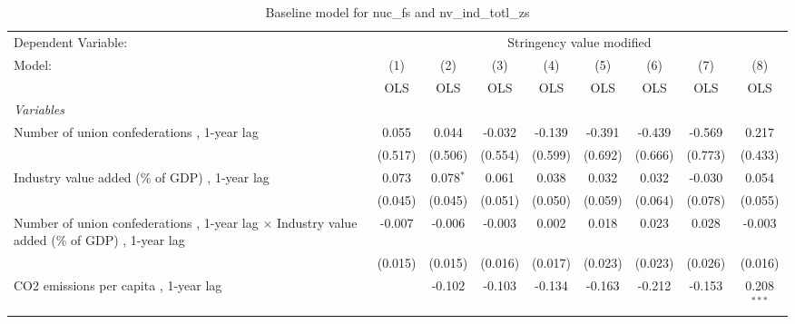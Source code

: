
\begin{table}[htbp]
   \caption{Baseline model for nuc\_fs and nv\_ind\_totl\_zs}
   \centering
   \begin{tabular}{lcccccccc}
      \toprule
      Dependent Variable: & \multicolumn{8}{c}{Stringency value modified}\\
      Model:                                                                                               & (1)     & (2)         & (3)     & (4)          & (5)          & (6)           & (7)           & (8)\\  
                                                                                                           &  OLS    & OLS         & OLS     & OLS          & OLS          & OLS           & OLS           & OLS\\  
      \midrule
      \emph{Variables}\\
      Number of union confederations , 1-year lag                                                          & 0.055   & 0.044       & -0.032  & -0.139       & -0.391       & -0.439        & -0.569        & 0.217\\   
                                                                                                           & (0.517) & (0.506)     & (0.554) & (0.599)      & (0.692)      & (0.666)       & (0.773)       & (0.433)\\   
      Industry value added (\% of GDP) , 1-year lag                                                        & 0.073   & 0.078$^{*}$ & 0.061   & 0.038        & 0.032        & 0.032         & -0.030        & 0.054\\   
                                                                                                           & (0.045) & (0.045)     & (0.051) & (0.050)      & (0.059)      & (0.064)       & (0.078)       & (0.055)\\   
      Number of union confederations , 1-year lag $\times$ Industry value added (\% of GDP) , 1-year lag   & -0.007  & -0.006      & -0.003  & 0.002        & 0.018        & 0.023         & 0.028         & -0.003\\   
                                                                                                           & (0.015) & (0.015)     & (0.016) & (0.017)      & (0.023)      & (0.023)       & (0.026)       & (0.016)\\   
      CO2 emissions per capita , 1-year lag                                                                &         & -0.102      & -0.103  & -0.134       & -0.163       & -0.212        & -0.153        & 0.208$^{***}$\\   

\end{tabular}
\end{table}
